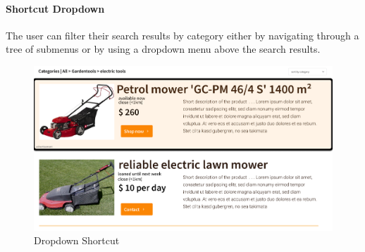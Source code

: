 	\paragraph{Shortcut Dropdown}
		The user can filter their search results by category either by navigating through a tree of submenus or by using a dropdown menu above the search results.
		\begin{figure}[H]
			\centering
			\includegraphics[width=\linewidth]{abb/3_design_guidelines/dropdown_shortcut.png}
			\caption{Dropdown Shortcut}
			\label{fig:dropdown_shortcut}
		\end{figure}
	\par
	
	
	
	